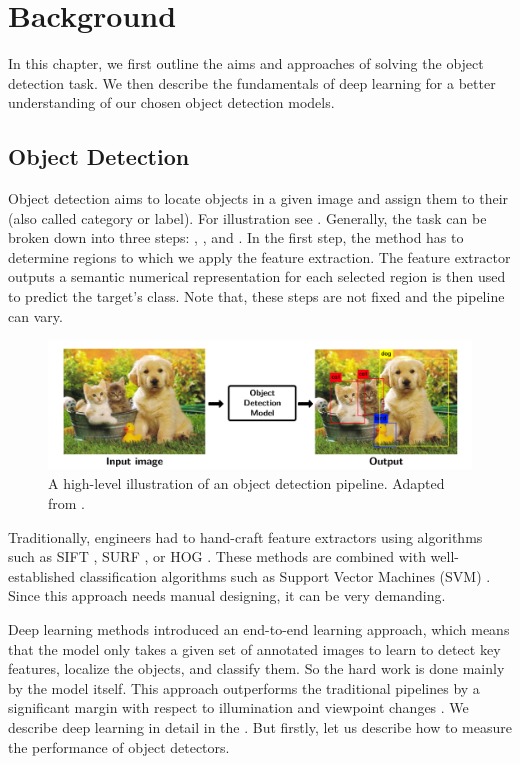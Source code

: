\chapter{Background}
In this chapter, we first outline the aims and approaches of solving the object
detection task. We then describe the fundamentals of deep learning for a better
understanding of our chosen object detection models.

\section{Object Detection}
Object detection aims to locate objects in a given image and assign them to
their  (also called category or label). For illustration see
. Generally, the task can be broken down into three steps:
, , and
. In the first step, the method has to determine regions to
which we apply the feature extraction. The feature extractor outputs a semantic
numerical representation for each selected region is then used to predict the
target's class. Note that, these steps are not fixed and the pipeline can vary.

\begin{figure}[h]
    \centering
    \includegraphics[width=0.9\linewidth]{Sources/Figures/objectdetection.png}
    \caption{A high-level illustration of an object detection pipeline. Adapted
        from \cite{objectdetectionfigure}.}
    \label{fig:od}
\end{figure}

Traditionally, engineers had to hand-craft feature extractors using algorithms
such as SIFT \cite{sift}, SURF \cite{surf}, or HOG \cite{hog}. These methods are
combined with well-established classification algorithms such as Support Vector
Machines (SVM) \cite{svm}. Since this approach needs manual designing, it can be
very demanding.

Deep learning methods introduced an end-to-end learning approach, which means
that the model only takes a given set of annotated images to learn to detect key
features, localize the objects, and classify them. So the hard work is done
mainly by the model itself. This approach outperforms the traditional pipelines
by a significant margin with respect to illumination and viewpoint changes
\cite{outperforming}. We describe deep learning in detail in the
. But firstly, let us describe how to measure the
performance of object detectors.

